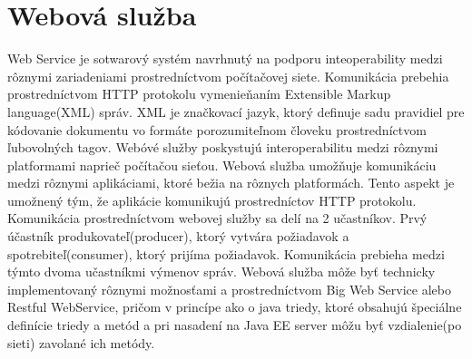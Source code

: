 \section{Webová služba}\label{webkap}
Web Service je sotwarový systém navrhnutý na podporu inteoperability medzi rôznymi zariadeniami prostredníctvom počítačovej siete. Komunikácia prebehia prostredníctvom HTTP protokolu vymenieňaním Extensible Markup language(XML) správ. XML je značkovací jazyk, ktorý definuje sadu pravidiel pre kódovanie dokumentu vo formáte porozumiteľnom človeku prostredníctvom ľubovolných tagov. Webóvé služby poskystujú interoperabilitu medzi rôznymi platformami naprieč počítačou sieťou. Webová služba umožňuje komunikáciu medzi rôznymi aplikáciami, ktoré bežia na rôznych platformách. Tento aspekt je umožnený tým, že aplikácie komunikujú prostredníctov HTTP protokolu. Komunikácia prostredníctvom webovej služby sa delí na 2 učastníkov. Prvý účastník produkovateľ(producer), ktorý vytvára požiadavok a spotrebiteľ(consumer), ktorý prijíma požiadavok. Komunikácia prebieha medzi týmto dvoma učastníkmi výmenov správ. Webová služba môže byť technicky implementovaný rôznymi možnosťami a prostredníctvom Big Web Service alebo Restful WebService, pričom v princípe ako o java triedy, ktoré obsahujú špeciálne definície triedy a metód a pri nasadení na Java EE server môžu byť vzdialenie(po sieti) zavolané ich metódy. 



